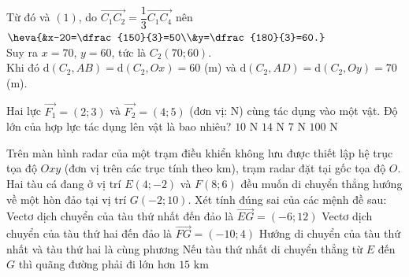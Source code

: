 \begin{ex}
{{
		} 
		\noindent 
		Từ đó  và $(1)$, do $\overrightarrow{C_1C_2}=\dfrac{1}{3}\overrightarrow{C_1C_4}$ nên $\heva{&x-20=\dfrac{150}{3}=50\\&y=\dfrac{180}{3}=60.}$\\
		Suy ra $x=70$, $y=60$,  tức là $C_2(70;60)$.\\
		Khi  đó $\mathrm{d}(C_2,AB)=\mathrm{d}(C_2,Ox)=60$ (m) và $\mathrm{d}(C_2,AD)=\mathrm{d}(C_2,Oy)=70$ (m).
	 }
\end{ex}

\begin{ex}%
	Hai lực $\overrightarrow{F_1}=(2;3)$ và $\overrightarrow{F_2}=(4;5)$ (đơn vị: N) cùng tác dụng vào một vật. Độ lớn của hợp lực tác dụng lên vật là bao nhiêu?
	\choice
	{\True $10 \text{ N}$}
	{$14 \text{ N}$}
	{$7 \text{ N}$}
	{$100 \text{ N}$}
\end{ex}

\begin{ex}%
	Trên màn hình radar của một trạm điều khiển không lưu được thiết lập hệ trục tọa độ $Oxy$ (đơn vị trên các trục tính theo km), trạm radar đặt tại gốc tọa độ $O$. Hai tàu cá đang ở vị trí $E(4;-2)$ và $F(8;6)$ đều muốn di chuyển thẳng hướng về một hòn đảo tại vị trí $G(-2;10)$. Xét tính đúng sai của các mệnh đề sau:
	\choiceTF
	{\True Vectơ dịch chuyển của tàu thứ nhất đến đảo là $\overrightarrow{EG} = (-6;12)$}
	{\True Vectơ dịch chuyển của tàu thứ hai đến đảo là $\overrightarrow{FG} = (-10;4)$}
	{Hướng di chuyển của tàu thứ nhất và tàu thứ hai là cùng phương}
	{Nếu tàu thứ nhất di chuyển thẳng từ $E$ đến $G$ thì quãng đường phải đi lớn hơn $15\text{ km}$}
\end{ex}

